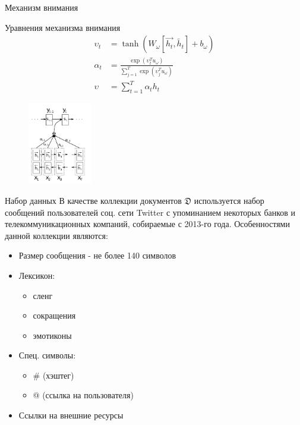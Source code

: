\documentclass{beamer}
\begin{document}
\begin{frame}{Механизм внимания}
	\begin{block}{Уравнения механизма внимания}
	\begin{align}
	\upsilon_{t}&=\tanh{(W_{\omega}\left[\overrightarrow{h_{t}},\overleftarrow{h_{t}}\right]+b_{\omega})}\\
	\alpha_{t}&=\frac{\exp{(\upsilon_{t}^{T}u_{\omega})}}{\sum_{j=1}^{T}\exp{(\upsilon_{j}^{T}u_{\omega})}}\\
	\upsilon&=\sum_{t=1}^{T}\alpha_{t}h_{t}
	\end{align}	
	\end{block}
\begin{figure}[!h]
  \includegraphics[width=0.25\textwidth]{images/attention.png}
\end{figure}
\end{frame}
\begin{frame}{Набор данных}
	В качестве коллекции документов $\mathfrak{D}$ используется набор сообщений пользователей соц. сети Twitter с упоминанием некоторых банков и телекоммуникационных компаний, собираемые с 2013-го года. Особенностями данной коллекции являются:
	\begin{itemize}
	\item Размер сообщения - не более 140 символов
	\item Лексикон:
		\begin{itemize}
			 \item сленг
			 \item сокращения
			 \item эмотиконы		
		\end{itemize}
	\item Спец. символы:
		\begin{itemize}
			 \item \# (хэштег)
			 \item @ (ссылка на пользователя)
		\end{itemize}
	\item Ссылки на внешние ресурсы
	\end{itemize}
\end{frame}
\end{document}
